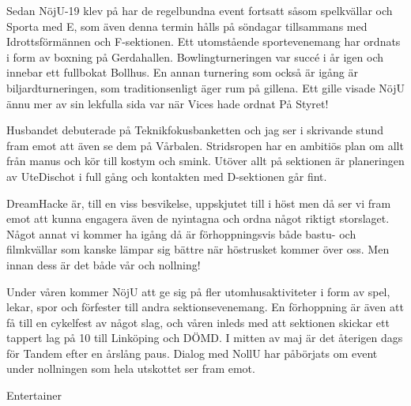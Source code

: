 \documentclass[../_main/handlingar.tex]{subfiles}
\begin{document}


Sedan NöjU-19 klev på har de regelbundna event fortsatt såsom spelkvällar och Sporta med E, som även denna termin hålls på söndagar tillsammans med Idrottsförmännen och F-sektionen. Ett utomstående sportevenemang har ordnats i form av boxning på Gerdahallen. Bowlingturneringen var succé i år igen och innebar ett fullbokat Bollhus. En annan turnering som också är igång är biljardturneringen, som traditionsenligt äger rum på gillena. Ett gille visade NöjU ännu mer av sin lekfulla sida var när Vices hade ordnat På Styret!

Husbandet debuterade på Teknikfokusbanketten och jag ser i skrivande stund fram emot att även se dem på Vårbalen. Stridsropen har en ambitiös plan om allt från manus och kör till kostym och smink. Utöver allt på sektionen är planeringen av UteDischot i full gång och kontakten med D-sektionen går fint.

DreamHacke är, till en viss besvikelse, uppskjutet till i höst men då ser vi fram emot att kunna engagera även de nyintagna och ordna något riktigt storslaget. Något annat vi kommer ha igång då är förhoppningsvis både bastu- och filmkvällar som kanske lämpar sig bättre när höstrusket kommer över oss. Men innan dess är det både vår och nollning! 

Under våren kommer NöjU att ge sig på fler utomhusaktiviteter i form av spel, lekar, spor och förfester till andra sektionsevenemang. En förhoppning är även att få till en cykelfest av något slag, och våren inleds med att sektionen skickar ett tappert lag på 10 till Linköping och DÖMD. I mitten av maj är det återigen dags för Tandem efter en årslång paus. Dialog med NollU har påbörjats om event under nollningen som hela utskottet ser fram emot. 


\begin{signatures}{1}
    \mvh
    \signature{\ent}{Entertainer}
\end{signatures}
\end{document}
